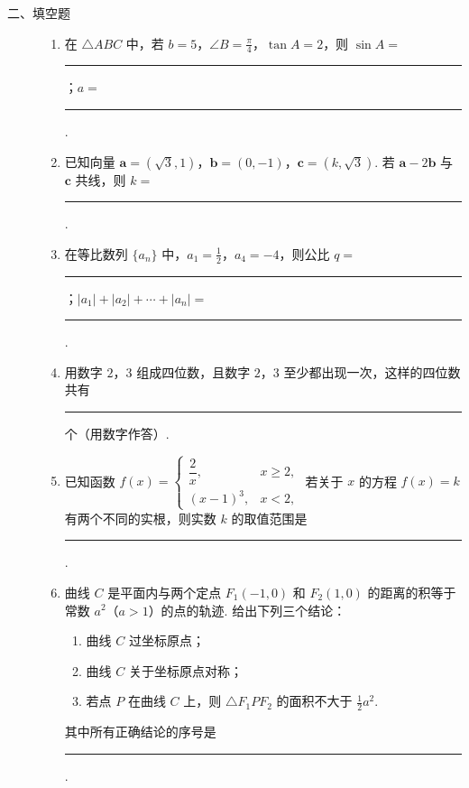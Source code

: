 \begin{description}

    \item[二、填空题]

    \begin{enumerate}[leftmargin=5pt]

      \addtocounter{enumi}{+8}

        \item 在 \(\triangle ABC\) 中，若 \(b = 5\)，\(\angle B = \frac{\pi}{4}\)，\(\tan A = 2\)，则 \(\sin A=\)\rule[-0.3ex]{3em}{0.4pt}；\(a=\)\rule[-0.3ex]{3em}{0.4pt}.

        \item 已知向量 \(\bm{a} = (\sqrt{3}, 1)\)，\(\bm{b} = (0, -1)\)，\(\bm{c} = (k, \sqrt{3})\). 若 \(\bm{a} - 2\bm{b}\) 与 \(\bm{c}\) 共线，则 \(k=\)\rule[-0.3ex]{3em}{0.4pt}.

        \item 在等比数列 \(\{a_n\}\) 中，\(a_1 = \frac{1}{2}\)，\(a_4 = -4\)，则公比 \(q=\)\rule[-0.3ex]{3em}{0.4pt}；\(|a_1| + |a_2| + \cdots + |a_n| = \)\rule[-0.3ex]{3em}{0.4pt}.

        \item 用数字 \(2\)，\(3\) 组成四位数，且数字 \(2\)，\(3\) 至少都出现一次，这样的四位数共有\rule[-0.3ex]{3em}{0.4pt} 个（用数字作答）.

        \item 已知函数 \(f(x) = \begin{cases}
\dfrac{2}{x}, & x \geqslant 2,\\
(x - 1)^3, & x < 2,
\end{cases}\)
若关于 \(x\) 的方程 \(f(x) = k\) 有两个不同的实根，则实数 \(k\) 的取值范围是\rule[-0.3ex]{3em}{0.4pt}.

        \item 曲线 \(C\) 是平面内与两个定点 \(F_1(-1, 0)\) 和 \(F_2(1, 0)\) 的距离的积等于常数 \(a^2\)（\(a > 1\)）的点的轨迹. 给出下列三个结论：

\begin{enumerate}
\item 曲线 \(C\) 过坐标原点；
\item 曲线 \(C\) 关于坐标原点对称；
\item 若点 \(P\) 在曲线 \(C\) 上，则 \(\triangle F_1PF_2\) 的面积不大于 \(\frac{1}{2}a^2\).
\end{enumerate}

其中所有正确结论的序号是\rule[-0.3ex]{3em}{0.4pt}.

    \end{enumerate}

\end{description}

